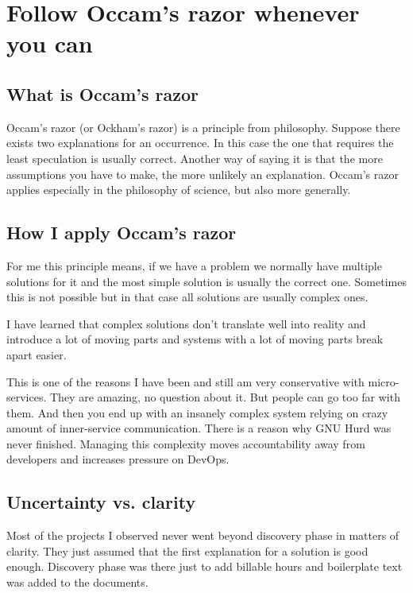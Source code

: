 \chapter{Follow Occam’s razor whenever you can}

\section{What is Occam’s razor}

Occam’s razor (or Ockham’s razor) is a principle from philosophy. Suppose there exists two explanations for an occurrence. In this case the one that requires the least speculation is usually correct. Another way of saying it is that the more assumptions you have to make, the more unlikely an explanation. Occam’s razor applies especially in the philosophy of science, but also more generally.

\section{How I apply Occam’s razor}

For me this principle means, if we have a problem we normally have multiple solutions for it and the most simple solution is usually the correct one. Sometimes this is not possible but in that case all solutions are usually complex ones.

I have learned that complex solutions don’t translate well into reality and introduce a lot of moving parts and systems with a lot of moving parts break apart easier.

This is one of the reasons I have been and still am very conservative with micro-services. They are amazing, no question about it. But people can go too far with them. And then you end up with an insanely complex system relying on crazy amount of inner-service communication. There is a reason why GNU Hurd was never finished. Managing this complexity moves accountability away from developers and increases pressure on DevOps.

\section{Uncertainty vs. clarity}

Most of the projects I observed never went beyond discovery phase in matters of clarity. They just assumed that the first explanation for a solution is good enough. Discovery phase was there just to add billable hours and boilerplate text was added to the documents.

